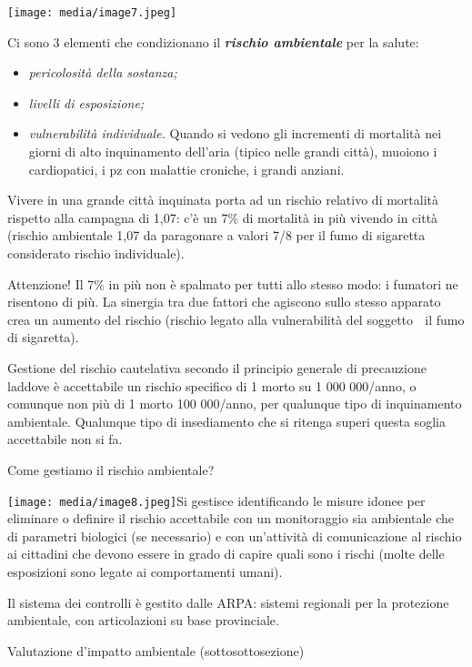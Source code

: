 \documentclass[]{article}
\begin{document}
\texttt{[image: media/image7.jpeg]}

Ci sono 3 elementi che condizionano il \emph{\textbf{rischio
ambientale}} per la salute:

\begin{itemize}
\item
  \emph{pericolosità della sostanza;}
\item
  \emph{livelli di esposizione;}
\item
  \emph{vulnerabilità individuale.} Quando si vedono gli incrementi di
  mortalità nei giorni di alto inquinamento dell'aria (tipico nelle
  grandi città), muoiono i cardiopatici, i pz con malattie croniche, i
  grandi anziani.
\end{itemize}

Vivere in una grande città inquinata porta ad un rischio relativo di
mortalità rispetto alla campagna di 1,07: c'è un 7\% di mortalità in più
vivendo in città (rischio ambientale 1,07 da paragonare a valori 7/8 per
il fumo di sigaretta considerato rischio individuale).

Attenzione! Il 7\% in più non è spalmato per tutti allo stesso modo: i
fumatori ne risentono di più. La sinergia tra due fattori che agiscono
sullo stesso apparato crea un aumento del rischio (rischio legato alla
vulnerabilità del soggetto  il fumo di sigaretta).

Gestione del rischio cautelativa secondo il principio generale di
precauzione laddove è accettabile un rischio specifico di 1 morto su 1
000 000/anno, o comunque non più di 1 morto 100 000/anno, per qualunque
tipo di inquinamento ambientale. Qualunque tipo di insediamento che si
ritenga superi questa soglia accettabile non si fa.

Come gestiamo il rischio ambientale?

\texttt{[image: media/image8.jpeg]}Si
gestisce identificando le misure idonee per eliminare o definire il
rischio accettabile con un monitoraggio sia ambientale che di parametri
biologici (se necessario) e con un'attività di comunicazione al rischio
ai cittadini che devono essere in grado di capire quali sono i rischi
(molte delle esposizioni sono legate ai comportamenti umani).

Il sistema dei controlli è gestito dalle ARPA: sistemi regionali per la
protezione ambientale, con articolazioni su base provinciale.

Valutazione d'impatto ambientale (sottosottosezione)
\end{document}
